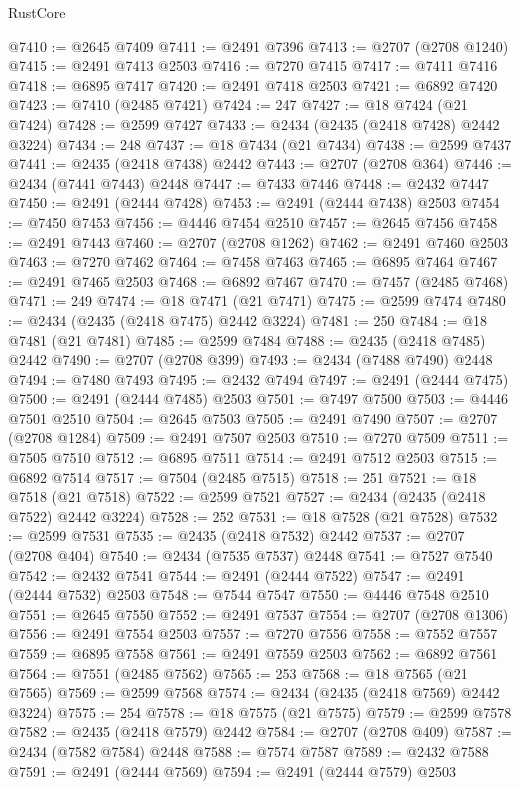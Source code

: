 \begin{lexlean}{RustCore}
\begin{coremodule}
@7410 := @2645 @7409
@7411 := @2491 @7396
@7413 := @2707 (@2708 @1240)
@7415 := @2491 @7413 @2503
@7416 := @7270 @7415
@7417 := @7411 @7416
@7418 := @6895 @7417
@7420 := @2491 @7418 @2503
@7421 := @6892 @7420
@7423 := @7410 (@2485 @7421)
@7424 := 247
@7427 := @18 @7424 (@21 @7424)
@7428 := @2599 @7427
@7433 := @2434 (@2435 (@2418 @7428) @2442 @3224)
@7434 := 248
@7437 := @18 @7434 (@21 @7434)
@7438 := @2599 @7437
@7441 := @2435 (@2418 @7438) @2442
@7443 := @2707 (@2708 @364)
@7446 := @2434 (@7441 @7443) @2448
@7447 := @7433 @7446
@7448 := @2432 @7447
@7450 := @2491 (@2444 @7428)
@7453 := @2491 (@2444 @7438) @2503
@7454 := @7450 @7453
@7456 := @4446 @7454 @2510
@7457 := @2645 @7456
@7458 := @2491 @7443
@7460 := @2707 (@2708 @1262)
@7462 := @2491 @7460 @2503
@7463 := @7270 @7462
@7464 := @7458 @7463
@7465 := @6895 @7464
@7467 := @2491 @7465 @2503
@7468 := @6892 @7467
@7470 := @7457 (@2485 @7468)
@7471 := 249
@7474 := @18 @7471 (@21 @7471)
@7475 := @2599 @7474
@7480 := @2434 (@2435 (@2418 @7475) @2442 @3224)
@7481 := 250
@7484 := @18 @7481 (@21 @7481)
@7485 := @2599 @7484
@7488 := @2435 (@2418 @7485) @2442
@7490 := @2707 (@2708 @399)
@7493 := @2434 (@7488 @7490) @2448
@7494 := @7480 @7493
@7495 := @2432 @7494
@7497 := @2491 (@2444 @7475)
@7500 := @2491 (@2444 @7485) @2503
@7501 := @7497 @7500
@7503 := @4446 @7501 @2510
@7504 := @2645 @7503
@7505 := @2491 @7490
@7507 := @2707 (@2708 @1284)
@7509 := @2491 @7507 @2503
@7510 := @7270 @7509
@7511 := @7505 @7510
@7512 := @6895 @7511
@7514 := @2491 @7512 @2503
@7515 := @6892 @7514
@7517 := @7504 (@2485 @7515)
@7518 := 251
@7521 := @18 @7518 (@21 @7518)
@7522 := @2599 @7521
@7527 := @2434 (@2435 (@2418 @7522) @2442 @3224)
@7528 := 252
@7531 := @18 @7528 (@21 @7528)
@7532 := @2599 @7531
@7535 := @2435 (@2418 @7532) @2442
@7537 := @2707 (@2708 @404)
@7540 := @2434 (@7535 @7537) @2448
@7541 := @7527 @7540
@7542 := @2432 @7541
@7544 := @2491 (@2444 @7522)
@7547 := @2491 (@2444 @7532) @2503
@7548 := @7544 @7547
@7550 := @4446 @7548 @2510
@7551 := @2645 @7550
@7552 := @2491 @7537
@7554 := @2707 (@2708 @1306)
@7556 := @2491 @7554 @2503
@7557 := @7270 @7556
@7558 := @7552 @7557
@7559 := @6895 @7558
@7561 := @2491 @7559 @2503
@7562 := @6892 @7561
@7564 := @7551 (@2485 @7562)
@7565 := 253
@7568 := @18 @7565 (@21 @7565)
@7569 := @2599 @7568
@7574 := @2434 (@2435 (@2418 @7569) @2442 @3224)
@7575 := 254
@7578 := @18 @7575 (@21 @7575)
@7579 := @2599 @7578
@7582 := @2435 (@2418 @7579) @2442
@7584 := @2707 (@2708 @409)
@7587 := @2434 (@7582 @7584) @2448
@7588 := @7574 @7587
@7589 := @2432 @7588
@7591 := @2491 (@2444 @7569)
@7594 := @2491 (@2444 @7579) @2503

\end{coremodule}
\end{lexlean}
